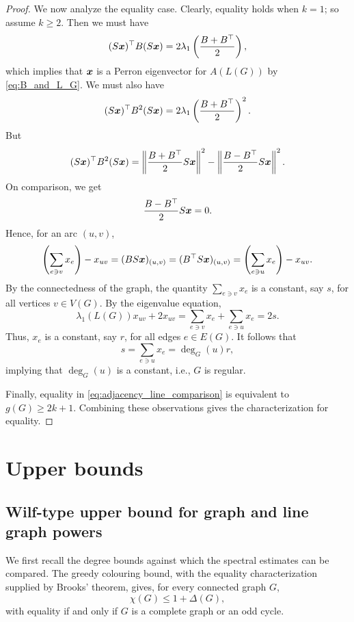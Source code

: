 \documentclass[11pt]{article}
\theoremstyle{plain}
\numberwithin{equation}{section}
\def\x{\mbox{\boldmath $x$}}
\begin{document}
\begin{proof}
We now analyze the equality case. Clearly, equality holds when $k=1$; so assume $k\ge 2$. Then we must have
\[ (S\x)^\top B (S\x) = 2 \lambda_1\left(\frac{B+B^\top}{2}\right),\]
which implies that $\x$ is a Perron eigenvector for $A(L(G))$ by \eqref{eq:B_and_L_G}. We must also have
\[ (S\x)^\top B^2 (S\x) = 2 \lambda_1\left(\frac{B+B^\top}{2}\right)^2. \]
But 
\[(S\x)^\top B^2 (S\x) = \left\|\frac{B+B^\top}{2}S\x\right\|^2 - \left\|\frac{B-B^\top}{2}S\x \right\|^2.\]
On comparison, we get 
\[ \frac{B-B^\top}{2}S\x  = 0.\]
Hence, for an arc $(u,v)$, 
\[\left(\sum_{ e\ni v} x_e \right) - x_{uv} = (BS\x)_{(u,v)} = (B^\top S\x)_{(u,v)} = \left(\sum_{ e\ni u} x_e \right) - x_{uv}.\]
By the connectedness of the graph, the quantity $\sum_{ e\ni v} x_e$ is a constant, say $s$, for all vertices $v\in V(G)$. By the eigenvalue equation, 
\[\lambda_1(L(G))x_{uv} + 2x_{uv} = \sum_{ e\ni v}x_e + \sum_{ e\ni u}x_e =2s.\]
Thus, $x_{e}$ is a constant, say $r$, for all edges $e\in E(G)$. It follows that 
\[s = \sum_{e\ni u} x_e = \deg_G(u)r,\]
implying that $\deg_G(u)$ is a constant, i.e., $G$ is regular. 

Finally, equality in \eqref{eq:adjacency_line_comparison} is equivalent to $g(G)\ge 2k+1$. Combining these observations gives the characterization for equality. 
\end{proof}

\section{Upper bounds} \label{sec:wilfspectrarelated}


\subsection{Wilf-type upper bound for graph and line graph powers}

We first recall the degree bounds against which the spectral estimates can be compared. The greedy colouring bound, with the equality characterization supplied by Brooks' theorem, gives, for every connected graph $G$,
\begin{equation}\label{eq:Brooks}
  \chi(G)\le 1 + \Delta(G), 
\end{equation}
with equality if and only if $G$ is a complete graph or an odd cycle.
\end{document}
